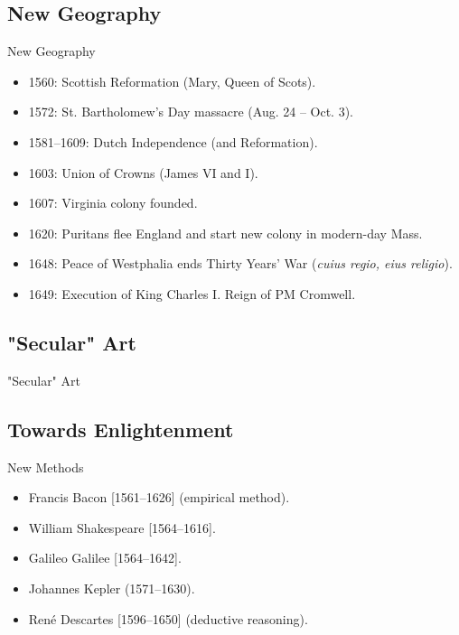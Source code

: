 \subsection{New Geography}
\begin{frame}{New Geography}
	\begin{itemize}
		\item<1->1560: Scottish Reformation (Mary, Queen of Scots).
		\item<2->1572: St. Bartholomew's Day massacre (Aug. 24 -- Oct. 3).
		\item<3->1581--1609: Dutch Independence (and Reformation).
		\item<4->1603: Union of Crowns (James VI and I).
		\item<5->1607: Virginia colony founded.
		\item<6->1620: Puritans flee England and start new colony in modern-day Mass.
		\item<7->1648: Peace of Westphalia ends Thirty Years' War (\emph{cuius regio, eius religio}).
		\item<8->1649: Execution of King Charles I. Reign of PM Cromwell.
	\end{itemize}
\end{frame}

\subsection{"Secular" Art}
\begin{frame}{"Secular" Art}
\end{frame}


\subsection{Towards Enlightenment}
\begin{frame}{New Methods}
	\begin{itemize}
		\item<1->Francis Bacon [1561--1626] (empirical method).
		\item<2->William Shakespeare [1564--1616].
		\item<3->Galileo Galilee [1564--1642].
		\item<4->Johannes Kepler (1571--1630).
		\item<5->Ren{\'e} Descartes [1596--1650] (deductive reasoning).
	\end{itemize}
\end{frame}

